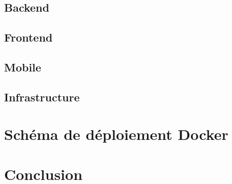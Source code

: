 \subsection{Backend}

\subsection{Frontend}

\subsection{Mobile}

\subsection{Infrastructure}

\section{Schéma de déploiement Docker}

\section*{Conclusion}
